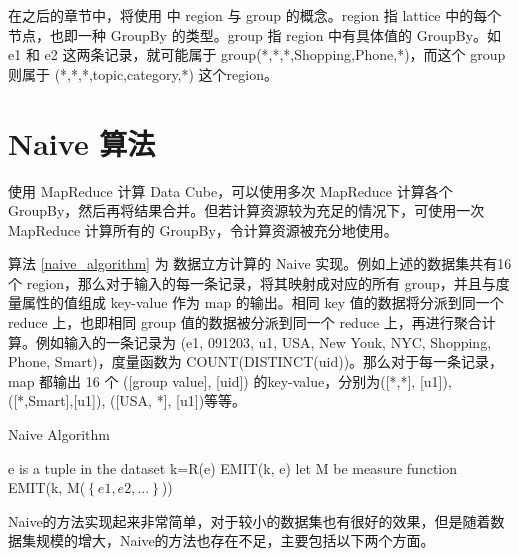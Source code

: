 在之后的章节中，将使用 \cite{nandi2011distributed} 中 region 与 group 的概念。region 指 lattice 中的每个节点，也即一种 GroupBy 的类型。group 指 region 中有具体值的 GroupBy。如 e1 和 e2 这两条记录，就可能属于 group(*,*,*,Shopping,Phone,*)，而这个 group 则属于 (*,*,*,topic,category,*) 这个region。

\section{Naive 算法}

使用 MapReduce 计算 Data Cube，可以使用多次 MapReduce 计算各个 GroupBy，然后再将结果合并。但若计算资源较为充足的情况下，可使用一次 MapReduce 计算所有的 GroupBy，令计算资源被充分地使用。

算法 \ref{naive_algorithm} 为 数据立方计算的 Naive 实现。例如上述的数据集共有16个 region，那么对于输入的每一条记录，将其映射成对应的所有 group，并且与度量属性的值组成 key-value 作为 map 的输出。相同 key 值的数据将分派到同一个 reduce 上，也即相同 group 值的数据被分派到同一个 reduce 上，再进行聚合计算。例如输入的一条记录为 (e1, 091203, u1, USA, New Youk, NYC, Shopping, Phone, Smart)，度量函数为 COUNT(DISTINCT(uid))。那么对于每一条记录，map 都输出 16 个 ([group value], [uid]) 的key-value，分别为([*,*], [u1]), ([*,Smart],[u1]), ([USA, *], [u1])等等。

{\renewcommand\baselinestretch{1} 
\begin{algorithm}[!ht]
\caption{Naive Algorithm}
\label{naive_algorithm}
{\fontfamily{\familydefault}\selectfont

	\begin{algorithmic}[1] %
    	\State e is a tuple in the dataset
        	\State k=R(e)
        	\State EMIT(k, e)
        \EndFor
   	 \EndFunction
     \State
     	\State let M be measure function
        \State EMIT(k, M($\left\{ e1,e2,...\right\}$))
     \EndFunction
	\end{algorithmic}
}
\end{algorithm}
\par}

Naive的方法实现起来非常简单，对于较小的数据集也有很好的效果，但是随着数据集规模的增大，Naive的方法也存在不足，主要包括以下两个方面。

